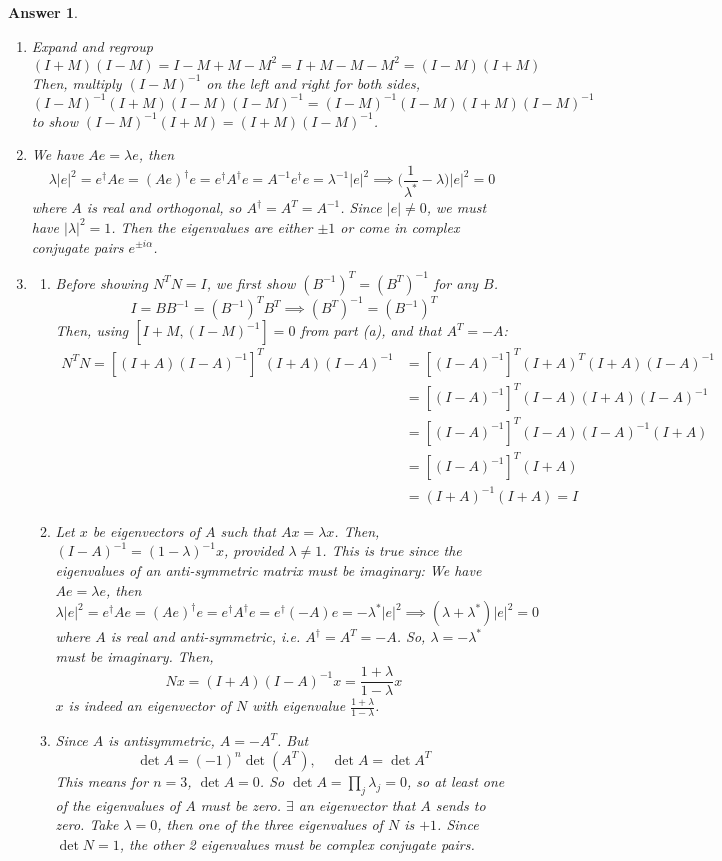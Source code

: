 \documentclass[a4paper]{article}
\newtheorem{ans}{Answer}[section]
\theoremstyle{new}
\begin{document}
\begin{ans}\leavevmode
\begin{enumerate}[label=(\alph*)]
\item Expand and regroup
$$(I+M)(I-M)=I-M+M-M^2=I+M-M-M^2=(I-M)(I+M)$$
Then, multiply $(I-M)^{-1}$ on the left and right for both sides, 
$$(I-M)^{-1}(I+M)(I-M)(I-M)^{-1}=(I-M)^{-1}(I-M)(I+M)(I-M)^{-1}$$
to show $(I-M)^{-1}(I+M)=(I+M)(I-M)^{-1}$.
\item We have $Ae=\lambda e$, then 
$$\lambda|e|^2=e^\dag Ae=(A e)^\dag e=e^\dag A^\dag e=A^{-1}e^\dag e=\lambda^{-1}|e|^2\implies\bigg(\frac{1}{\lambda^*}-\lambda\bigg)|e|^2=0$$
where $A$ is real and orthogonal, so $A^\dag=A^T=A^{-1}$. Since $|e|\neq 0$, we must have $|\lambda|^2=1$.  Then the eigenvalues are either $\pm1$ or come in complex conjugate pairs $e^{\pm i\alpha}$.
\item 
\begin{enumerate}[label=(\roman*)]
\item Before showing $N^TN=I$, we first show $(B^{-1})^T=(B^T)^{-1}$ for any $B$.
$$I=BB^{-1}=(B^{-1})^TB^T\implies (B^T)^{-1}=(B^{-1})^T$$
Then, using $[I+M,(I-M)^{-1}]=0$ from part (a), and that $A^T=-A$:
\begin{align}
    N^TN=[(I+A)(I-A)^{-1}]^T(I+A)(I-A)^{-1}&=[(I-A)^{-1}]^T(I+A)^T(I+A)(I-A)^{-1}\nonumber\\&=[(I-A)^{-1}]^T(I-A)(I+A)(I-A)^{-1}\nonumber\\&=[(I-A)^{-1}]^T(I-A)(I-A)^{-1}(I+A)\nonumber\\&=[(I-A)^{-1}]^T(I+A)\nonumber\\&=(I+A)^{-1}(I+A)=I\nonumber
\end{align}
\item Let $x$ be eigenvectors of $A$ such that $Ax=\lambda x$. Then, $(I-A)^{-1}=(1-\lambda)^{-1}x$, provided $\lambda\neq 1$. This is true since the eigenvalues of an anti-symmetric matrix must be imaginary: We have $Ae=\lambda e$, then 
$$\lambda|e|^2=e^\dag Ae=(A e)^\dag e=e^\dag A^\dag e=e^\dag(-A) e=-\lambda^*|e|^2\implies(\lambda+\lambda^*)|e|^2=0$$
where $A$ is real and anti-symmetric, i.e. $A^\dag=A^T=-A$. So, $\lambda=-\lambda^*$ must be imaginary. Then, 
$$Nx=(I+A)(I-A)^{-1}x=\frac{1+\lambda}{1-\lambda}x$$
$x$ is indeed an eigenvector of $N$ with eigenvalue $\frac{1+\lambda}{1-\lambda}$.
\item Since $A$ is antisymmetric, $A=-A^T$. But 
$$\det A=(-1)^n\det(A^T),\quad\det A=\det A^T$$ 
This means for $n=3$, $\det A=0$. So $\det A=\prod_j\lambda_j=0$, so at least one of the eigenvalues of $A$ must be zero. $\exists$ an eigenvector that $A$ sends to zero. Take $\lambda=0$, then one of the three eigenvalues of $N$ is $+1$. Since $\det N=1$, the other 2 eigenvalues must be complex conjugate pairs.
\end{enumerate}
\end{enumerate}
\end{ans}
\end{document}
